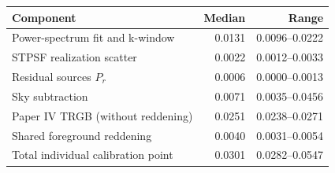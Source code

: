 \begin{tabular}{lrr}
\toprule
Component & Median & Range \\
\midrule
Power-spectrum fit and k-window & 0.0131 & 0.0096--0.0222 \\
STPSF realization scatter & 0.0022 & 0.0012--0.0033 \\
Residual sources $P_r$ & 0.0006 & 0.0000--0.0013 \\
Sky subtraction & 0.0071 & 0.0035--0.0456 \\
Paper IV TRGB (without reddening) & 0.0251 & 0.0238--0.0271 \\
Shared foreground reddening & 0.0040 & 0.0031--0.0054 \\
Total individual calibration point & 0.0301 & 0.0282--0.0547 \\
\bottomrule
\end{tabular}
